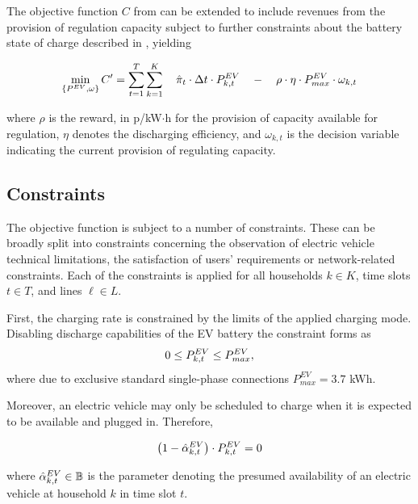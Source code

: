 The objective function $C$ from  can be extended to include revenues from the provision of regulation capacity subject to further constraints about the battery state of charge described in , yielding

\begin{equation}
	\label{eq:obj2}
	\min_{\{P^{EV},\omega\}} C'=\sum_{t=1}^T \sum_{k=1}^{K} \quad \hat{\pi}_t \cdot \Delta t \cdot P^{EV}_{k,t} \quad - \quad \rho \cdot \eta \cdot P^{EV}_{max} \cdot \omega_{k,t} 
\end{equation}

where $\rho$ is the reward, in p/kW$\cdot$h for the provision of capacity available for regulation, $\eta$ denotes the discharging efficiency, and $\omega_{k,t}$ is the decision variable indicating the current provision of regulating capacity. %

\subsection{Constraints}

The objective function is subject to a number of constraints. These can be broadly split into constraints concerning the observation of electric vehicle technical limitations, the satisfaction of users' requirements or network-related constraints. Each of the constraints is applied for all households $k \in K$, time slots $t \in T$, and lines $\ell \in L$.

First, the charging rate is constrained by the limits of the applied charging mode. Disabling discharge capabilities of the EV battery the constraint forms as
\begin{equation}
0  \leq P^{EV}_{k,t} \leq P^{EV}_{max},
\end{equation}
where due to exclusive standard single-phase connections $P^{EV}_{max} = 3.7$ kWh.

Moreover, an electric vehicle may only be scheduled to charge when it is expected to be available and plugged in. Therefore,

\begin{equation}
\left(1-\hat{\alpha}^{EV}_{k,t}\right)\cdot P^{EV}_{k,t} = 0 
\end{equation}

where $\hat{\alpha}^{EV}_{k,t} \in \mathbb{B}$ is the parameter denoting the presumed availability of an electric vehicle at household $k$ in time slot $t$.

